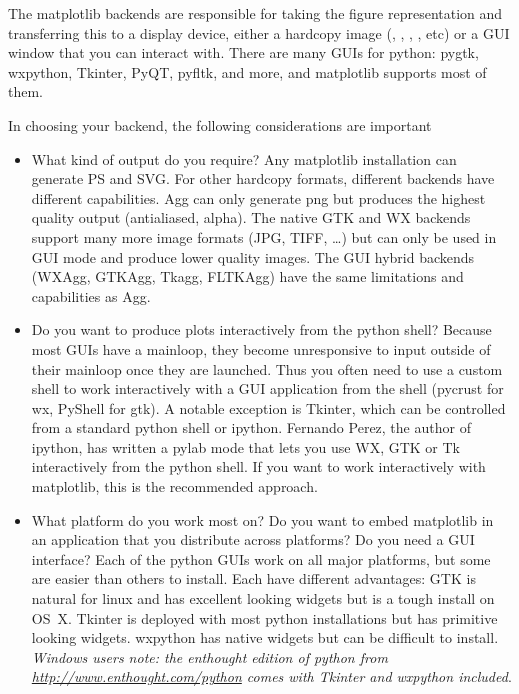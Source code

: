 \documentclass[twoside]{book}
\begin{document}
The matplotlib backends are responsible for taking the figure
representation and transferring this to a display device, either a
hardcopy image (, , ,
, etc) or a GUI window that you can interact with.  There
are many GUIs for python: pygtk, wxpython, Tkinter, PyQT, pyfltk, and
more, and matplotlib supports most of them.  

In choosing your backend, the following considerations are important

\begin{itemize}
\item What kind of output do you require?  Any matplotlib installation
  can generate PS and SVG.  For other hardcopy formats, different
  backends have different capabilities.  Agg can only generate png but
  produces the highest quality output (antialiased, alpha).  The
  native GTK and WX backends support many more image formats (JPG,
  TIFF, \dots) but can only be used in GUI mode and produce lower
  quality images.  The GUI hybrid backends (WXAgg, GTKAgg, Tkagg,
  FLTKAgg) have the same limitations and capabilities as Agg.
  
\item Do you want to produce plots interactively from the python
  shell?  Because most GUIs have a mainloop, they become unresponsive
  to input outside of their mainloop once they are launched.  Thus you
  often need to use a custom shell to work interactively with a GUI
  application from the shell (pycrust for wx, PyShell for gtk).  A
  notable exception is Tkinter, which can be controlled from a
  standard python shell or ipython.  Fernando Perez, the author of
  ipython, has written a pylab mode that lets you use WX, GTK or Tk
  interactively from the python shell.  If you want to work
  interactively with matplotlib, this is the recommended approach.

\item What platform do you work most on?  Do you want to embed
  matplotlib in an application that you distribute across platforms?
  Do you need a GUI interface?  Each of the python GUIs work on all
  major platforms, but some are easier than others to install.  Each
  have different advantages: GTK is natural for linux and has
  excellent looking widgets but is a tough install on OS~X.  Tkinter
  is deployed with most python installations but has primitive looking
  widgets.  wxpython has native widgets but can be difficult to
  install.  \textit{Windows users note: the enthought edition of
  python from \url{http://www.enthought.com/python} comes with Tkinter
  and wxpython included}.
  

\end{itemize}
\end{document}
